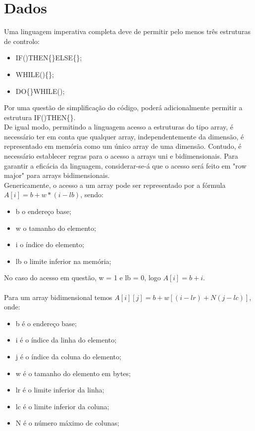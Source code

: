 \section{Dados}
\label{sec:dados:analise}

Uma linguagem imperativa completa deve de permitir pelo menos três estruturas de controlo:

\begin{itemize}
\item IF()THEN\{\}ELSE\{\};
\item WHILE()\{\};
\item DO\{\}WHILE();
\end{itemize}

Por uma questão de simplificação do código, poderá adicionalmente permitir a estrutura IF()THEN\{\}.\\

De igual modo, permitindo a linguagem acesso a estruturas do tipo array, é necessário ter em conta que qualquer array, independentemente da dimensão, é representado em memória como um único array de uma dimensão. Contudo, é necessário establecer regras para o acesso a arrays uni e bidimensionais. Para garantir a eficácia da linguagem, considerar-se-á que o acesso será feito em "row major" para arrays bidimensionais.\\

Genericamente, o acesso a um array pode ser representado por a fórmula $A[i] = b + w * (i - lb)$, sendo:

\begin{itemize}
\item b o endereço base;
\item w o tamanho do elemento;
\item i o índice do elemento;
\item lb o limite inferior na memória;
\end{itemize}

No caso do acesso em questão, w = 1 e lb = 0, logo $A[i] = b + i$.\\\\

Para um array bidimensional temos $A[i][j] = b + w [(i - lr) + N(j - lc)]$, onde:

\begin{itemize}
\item b é o endereço base;
\item i é o índice da linha do elemento;
\item j é o índice da coluna do elemento;
\item w é o tamanho do elemento em bytes;
\item lr é o limite inferior da linha;
\item lc é o limite inferior da coluna;
\item N é o número máximo de colunas;
\end{itemize}

